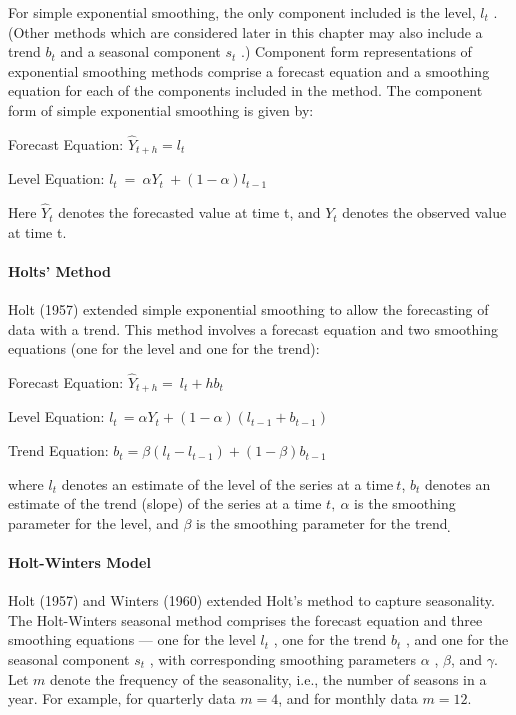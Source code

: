 \documentclass[
]{article}
\begin{document}
For simple exponential smoothing, the only component included is the
level, \(l_{t}\) . (Other methods which are considered later in this
chapter may also include a trend \(b_{t}\) and a seasonal component
\(s_{t}\) .) Component form representations of exponential smoothing
methods comprise a forecast equation and a smoothing equation for each
of the components included in the method. The component form of simple
exponential smoothing is given by:

Forecast Equation: \(\hat{Y}_{t + h} = l_{t}\)

Level Equation: \(l_{t}\  = \ \alpha Y_{t}\  + (1 - \alpha)l_{t - 1}\)

Here \(\hat{Y}_{t}\) denotes the forecasted value at time t, and
\(Y_{t}\) denotes the observed value at time t.

\hypertarget{holts-method}{%
\paragraph{Holts' Method}\label{holts-method}}

Holt (1957) extended simple exponential smoothing to allow the
forecasting of data with a trend. This method involves a forecast
equation and two smoothing equations (one for the level and one for the
trend):

Forecast Equation: \(\hat{Y}_{t + h} = \ l_{t} + hb_{t}\)

Level Equation:
\(l_{t\ } = \alpha Y_{t} + (1 - \alpha)(l_{t - 1} + b_{t - 1})\)

Trend Equation:
\(b_{t} = \beta(l_{t} - l_{t - 1}) + (1 - \beta)b_{t - 1}\)

where \(l_{t}\) denotes an estimate of the level of the series at a
time\(\ t\), \(b_{t}\) denotes an estimate of the trend (slope) of the
series at a time \(t,\ \alpha\) is the smoothing parameter for the
level, and \(\beta\) is the smoothing parameter for the trend ̣

\hypertarget{holt-winters-model}{%
\paragraph{\texorpdfstring{\textbf{Holt-Winters
Model}}{Holt-Winters Model}}\label{holt-winters-model}}

Holt (1957) and Winters (1960) extended Holt's method to capture
seasonality. The Holt-Winters seasonal method comprises the forecast
equation and three smoothing equations --- one for the level \(l_{t}\) ,
one for the trend \(b_{t}\) , and one for the seasonal component
\(s_{t}\) , with corresponding smoothing parameters \(\alpha\) ,
\(\beta\), and \(\gamma\). Let \(m\) denote the frequency of the
seasonality, i.e., the number of seasons in a year. For example, for
quarterly data \(m = 4\), and for monthly data \(m=12\).
\end{document}
